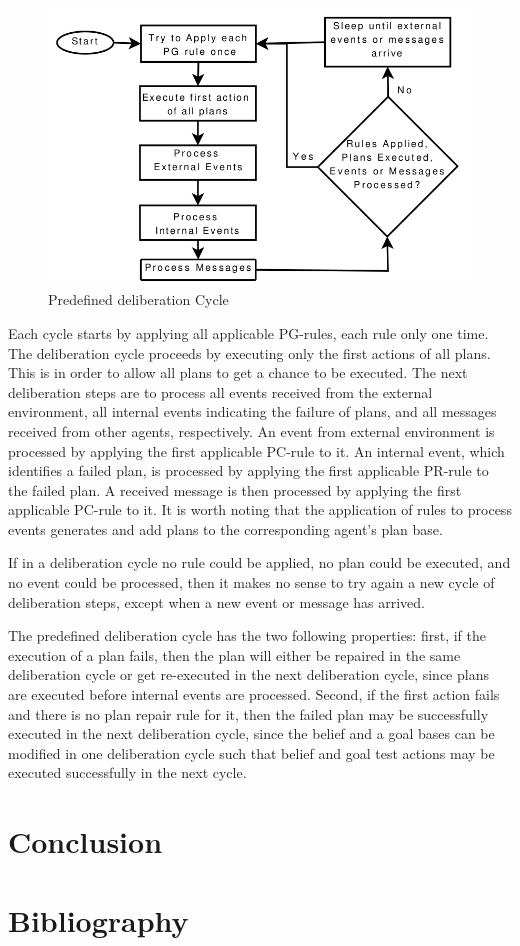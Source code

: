 \documentclass[a4paper]{article}
\begin{document}
\begin{figure}[htp]
\centering
\includegraphics[keepaspectratio,scale=0.35]{fig/rcycle.png}
\caption{Predefined deliberation Cycle}
\label{fig:deliberation_cycle}
\end{figure}
 
Each cycle starts by applying all applicable PG-rules, each rule only one time. The deliberation cycle proceeds by executing only the first actions of all plans. This is in order to allow all plans to get a chance to be executed. The next deliberation steps are to
process all events received from the external environment, all internal events indicating the failure of plans, and all messages received from other agents, respectively. An event from external environment is processed by applying the first applicable PC-rule to it. An internal event, which identifies a failed plan, is processed by applying the first applicable PR-rule to the failed plan. A received message is then processed by applying the first applicable PC-rule to it. It is worth noting that the application of rules
to process events generates and add plans to the corresponding agent’s plan base.

If in a deliberation cycle no rule could be applied, no plan could be executed, and no event could be processed, then it makes no sense to try again a new cycle of deliberation steps, except when a new event or message has arrived.

The predefined deliberation cycle has the two following properties: first, if the execution of a plan fails, then the plan will either be repaired in the same deliberation cycle or get re-executed in the next deliberation cycle, since plans are executed before internal events are processed. Second, if the first action fails and there is no plan repair rule for it, then the failed plan may be successfully executed in the next deliberation cycle, since the belief and a goal bases can be modified in one deliberation cycle such that belief and goal test actions may be executed successfully in the next cycle.


\section{Conclusion} %


\section{Bibliography}
\nocite{*}


\end{document}
